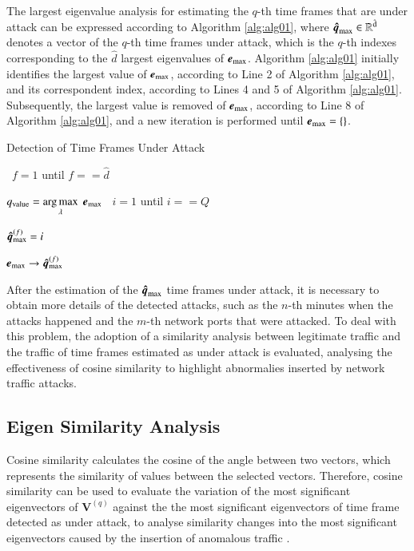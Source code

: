 \documentclass[review]{elsarticle}
\makeatletter
\DeclareMathOperator*{\argmax}{arg\,max}
\newcommand{\ALOOP}[1]{\ALC@it\algorithmicloop\ #1%
  \begin{ALC@loop}}
\newcommand{\ENDALOOP}{\end{ALC@loop}\ALC@it\algorithmicendloop}
\makeatother
\begin{document}
The largest eigenvalue analysis for estimating the $q$-th time frames that are under attack can be expressed according to Algorithm \ref{alg:alg01}, where $\rm{\boldsymbol{\hat{q}}}_{\rm max} \in \mathbb{R}^{\hat{d}}$ denotes a vector of the $q$-th time frames under attack, which is the $q$-th indexes corresponding to the $\hat{d}$ largest eigenvalues of $\boldsymbol{e}_{\rm max}$. Algorithm \ref{alg:alg01} initially identifies the largest value of $\boldsymbol{e}_{\rm max}$, according to Line 2 of Algorithm \ref{alg:alg01}, and its correspondent index, according to Lines 4 and 5 of Algorithm \ref{alg:alg01}. Subsequently, the largest value is removed of $\boldsymbol{e}_{\rm max}$, according to Line 8 of Algorithm \ref{alg:alg01}, and a new iteration is performed until $\boldsymbol{e}_{\rm max} = \{\}$.

\begin{algorithm}[h!]
	\caption{Detection of Time Frames Under Attack}
  	\label{alg:alg01}
	\begin{algorithmic}[1]
		\show\LOOP
	    \ALOOP {$f = 1$ until $f == \hat{d}$} 
	    	    \STATE $q_{\rm value} = \argmax\limits_{\lambda}  \hspace{1 mm} \boldsymbol{e}_{\rm max}$
    	    	    \ALOOP {$i = 1$ until $i == Q$} 
				    \STATE $\boldsymbol{\hat{q}}_{\rm max}^{(f)} = i$
				\ENDIF
        		\ENDALOOP
	    		\STATE $\boldsymbol{e}_{\rm max} \rightarrow \boldsymbol{\hat{q}}_{\rm max}^{(f)}$
    		\ENDALOOP
	\end{algorithmic}
\end{algorithm}

After the estimation of the $\rm{\boldsymbol{\hat{q}}}_{\rm max}$ time frames under attack, it is necessary to obtain more details of the detected attacks, such as the $n$-th minutes when the attacks happened and the $m$-th network ports that were attacked. To deal with this problem, the adoption of a similarity analysis between legitimate traffic and the traffic of time frames estimated as under attack is evaluated, analysing the effectiveness of cosine similarity to highlight abnormalies inserted by network traffic attacks. 

\subsection{Eigen Similarity Analysis}
\label{sec:prop_EigenSimilarityAnalysis}

Cosine similarity calculates the cosine of the angle between two vectors, which represents the similarity of values between the selected vectors. Therefore, cosine similarity can be used to evaluate the variation of the most significant eigenvectors of $\boldsymbol{V}^{(q)}$ against the the most significant eigenvectors of time frame detected as under attack, to analyse similarity changes into the most significant eigenvectors caused by the insertion of anomalous traffic \cite{Lee2013}. 
\end{document}
